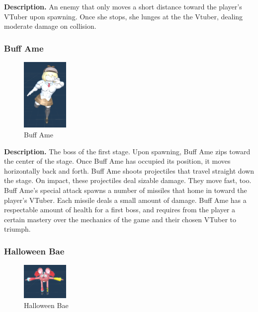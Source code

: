 \documentclass[10pt, a4paper]{article}
\begin{document}
\begin{multicols}{2}
	\textbf{Description.} An enemy that only moves a short distance toward the player's VTuber upon spawning. Once she stops, she lunges at the the Vtuber, dealing moderate damage on collision.
	
	\subsubsection{Buff Ame}

	\begin{figure}[H]
		\centering
		\includegraphics[width=0.2\textwidth]{images/buff_ame1.png}
		\caption{Buff Ame}
		\label{fig:buffame}
	\end{figure}

	\textbf{Description.} The boss of the first stage. Upon spawning, Buff Ame zips toward the center of the stage. Once Buff Ame has occupied its position, it moves horizontally back and forth. Buff Ame shoots projectiles that travel straight down the stage. On impact, these projectiles deal sizable damage. They move fast, too. Buff Ame's special attack spawns a number of missiles that home in toward the player's VTuber. Each missile deals a small amount of damage. Buff Ame has a respectable amount of health for a first boss, and requires from the player a certain mastery over the mechanics of the game and their chosen VTuber to triumph.

	\subsubsection{Halloween Bae}

	\begin{figure}[H]
		\centering
		\includegraphics[width=0.2\textwidth]{images/halloween_bae1.png}
		\caption{Halloween Bae}
		\label{fig:halloweenbae}
	\end{figure}


\end{multicols}
\end{document}
